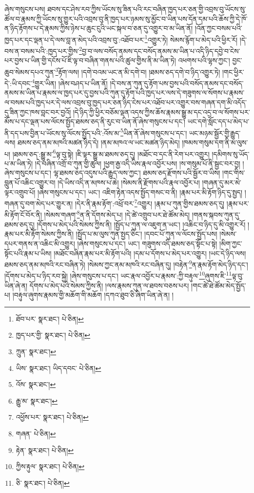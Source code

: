 ཞེས་གསུངས་པས། ཐབས་དང་ཤེས་རབ་ཀྱིས་ཡོངས་སུ་ཟིན་པའི་རང་བཞིན་ཁྱད་པར་ཅན་གྱི་འབྲས་བུ་ཡོངས་སུ་ཚོལ་བ་རྣམས་ཀྱི་ཡོངས་སུ་གྱུར་པའི་འབྲས་བུ་ནི་ཁྱད་པར་ཉམས་སུ་མྱོང་བ་ཡིན་པས་དོན་དམ་པའི་ཆོས་ཀྱི་དེ་ཁོ་ན་ཉིད་རྟོགས་པ་དེ་རྣམས་ཀྱིས་ཉེས་པ་ཆུང་ངུའི་ཡང་སྐལ་བ་ཅན་དུ་འགྱུར་བ་མ་ཡིན་ནོ། །འོན་ཀྱང་བསམ་པའི་ཁྱད་པར་དང་ལྡན་པ་དེ་ལས་བླ་ན་མེད་པའི་འབྲས་བུ་:འཐོབ་པར་\footnote{ཐོབ་པར་  སྣར་ཐང་།  པེ་ཅིན། }འགྱུར་ཏེ། སེམས་རྙོག་པ་མེད་པའི་ཕྱིར་རོ། །དེ་བས་ན་བསམ་པའི་:ཁྱད་པར་གྱིས་\footnote{ཁྱད་པར་གྱི་  སྣར་ཐང་།  པེ་ཅིན། }བྱ་བ་ལས་བསོད་ནམས་དང་བསོད་ནམས་མ་ཡིན་པ་འདི་ཉིད་དབྱེ་བ་ངེས་པར་བྱས་པ་ཡིན་གྱི་དངོས་པོ་ཇི་ལྟ་བ་བཞིན་གནས་པའི་ཚུལ་གྱིས་ནི་མ་ཡིན་ཏེ། འཕགས་པའི་ལྷས་ཀྱང་། བྱང་ཆུབ་སེམས་དཔའ་ཀུན་\footnote{ཀྲུན་  སྣར་ཐང་། }རྟོག་ལས། །དགེ་བའམ་ཡང་ན་མི་དགེ་བ། །ཐམས་ཅད་དགེ་བ་ཉིད་འགྱུར་ཏེ། །གང་ཕྱིར་དེ་:ཡི་དབང་\footnote{ཡིས་  སྣར་ཐང་། ཡིད་དབང་  པེ་ཅིན། }གྱུར་ཡིན། །ཞེས་བཤད་པ་ཡིན་ནོ། །དེ་བས་ན་ཀུན་དུ་རྟོག་པས་བྱས་པའི་བསོད་ནམས་དང་བསོད་ནམས་མ་ཡིན་པ་རྣམས་ལ་ཁྱད་པར་དུ་བྱས་པའི་ཀུན་དུ་རྟོག་པའི་ཁྱད་པར་ལས་དེ་གཟུགས་ལ་སོགས་པ་རྣམས་ལ་བསམ་པའི་ཁྱད་པར་དེ་ལས་འབྲས་བུ་ཁྱད་པར་ཅན་ཉིད་ངེས་པར་འཐོབ་པར་འགྱུར་བས་གཞན་དག་མི་འདོད་དུ་ཟིན་ཀྱང་ཁས་བླང་བར་བྱའོ། །དེ་ཉིད་ཀྱི་ཕྱིར་བཅོམ་ལྡན་འདས་ཀྱིས་ཆོས་རྣམས་སྒྱུ་མ་དང་འདྲ་བ་ལ་སོགས་པར་མོས་པ་དང་ལྡན་པས་ལོངས་སྤྱོད་ཐམས་ཅད་ནི་རུང་བ་ཡིན་ནོ་ཞེས་གསུངས་པ་དང་། ཡང་དགེ་སློང་དད་པ་མེད་པ་ནི་དད་པས་བྱིན་པ་ཡོངས་སུ་ལོངས་སྤྱོད་པའི་:འོས་མ་\footnote{འོས་  སྣར་ཐང་། }ཡིན་ནོ་ཞེས་གསུངས་པ་དང་། ཡང་མཉམ་སྦྱོར་གྱི་རྒྱུད་ལས། ཐམས་ཅད་ནམ་མཁའི་མཚན་ཉིད་དེ། །ནམ་མཁའ་ལ་ཡང་མཚན་ཉིད་མེད། །ཁམས་གསུམ་དག་ནི་མ་ལུས་པ། །ཐམས་ཅད་:སྒྱུ་མ་\footnote{རྒྱུ་མ་  སྣར་ཐང་། }ལྟ་བུ་སྟེ། །ཇི་ལྟར་སྒྱུ་མ་ཐམས་ཅད་དུ། །མཐོང་བ་དང་ནི་རེག་པར་འགྱུར། །དམིགས་སུ་ཡོད་པ་མ་ཡིན་ཏེ། །དེ་བཞིན་འགྲོ་བ་ཀུན་གྱི་ཚུལ། །ཕྱག་རྒྱ་འདི་ཡིས་རྣལ་འབྱོར་པས། །ས་གསུམ་པོ་ནི་སྦྱང་བར་བྱ། །ཞེས་གསུངས་པ་དང་། ལྷ་ཐམས་ཅད་འདུས་པའི་རྒྱུད་ལས་ཀྱང་། ཐམས་ཅད་རྫོགས་པའི་སྦྱོར་བ་ཡིས། །གང་གིས་བླུན་པོ་འཆིང་འགྱུར་བ། །དེ་ཡིས་འདི་ན་མཁས་པ་ཆེ། །སེམས་ནི་རྫོགས་པའི་རྣལ་འབྱོར་པ། །གཞན་དུ་མར་མེ་ལྟར་འགྲུབ་པོ། །ཞེས་གསུངས་པ་དང་། ཡང་། འཇིག་རྟེན་འདས་སྤྱོད་གསང་བ་ནི། །རྣམ་པར་མི་རྟོག་ཉིད་དུ་སྤྱད། །གཞན་དུ་བག་མེད་པར་གྱུར་ན། །དེར་ནི་རྣམ་རྟོག་:འཕྲོ་བར་\footnote{འཕྱོས་པར་  སྣར་ཐང་།  པེ་ཅིན། }འགྱུར། །རྣམ་པ་ཀུན་གྱིས་ཐམས་ཅད་དུ། །རྣམ་པར་མི་རྟོག་ངོ་བོར་ནི། །སེམས་གཞག་\footnote{གཞན་  པེ་ཅིན། }ན་ནི་དོགས་མེད་པ། །དེ་ཚེ་འགྲུབ་པར་ཐེ་ཚོམ་མེད། །གནས་སྐབས་ཀུན་དུ་ཐམས་ཅད་དུ། །དོགས་པ་མེད་པའི་སེམས་ཀྱིས་ནི། །སྤྱོད་པ་ཀུན་ལ་འཇུག་ན་ཡང་། །འཆིང་བ་ཉིད་དུ་མི་འགྱུར་རོ། །རྣམ་པར་མི་རྟོག་སེམས་ཀྱིས་ནི། །སྤྱོད་པ་མ་ལུས་ཀུན་སྤྱད་ཅིང་། །དབང་པོ་ཀུན་ལ་ལོངས་སྤྱོད་པས། །སེམས་དཔར་གནས་ན་འཆིང་མི་འགྱུར། །ཞེས་གསུངས་པ་དང་། ཡང་། གཟུགས་འདི་ཐམས་ཅད་སྟོང་པ་སྟེ། །མིག་ཀྱང་སྟོང་པའི་རྣམ་པ་ཡིས། །མཐོང་བཞིན་རྣམ་པར་མི་རྟོག་པའི། །དམ་པ་དོགས་པ་མེད་པར་འགྱུར། །ཡང་དེ་ཉིད་ལས། ཐམས་ཅད་ནམ་མཁའི་རང་བཞིན་ཏེ། །སེམས་ཀྱང་ནམ་མཁའི་རང་བཞིན་དུ། །བརྟེན་\footnote{རྟེན་  སྣར་ཐང་།  པེ་ཅིན། }ན་རྣམ་རྟོག་མེད་ཉིད་དང་། །དོགས་པ་མེད་པ་ཉིད་རབ་སྐྱེ། །ཞེས་གསུངས་པ་དང་། ཡང་རྣལ་འབྱོར་པ་རྣམས་:ཀྱི་བརྟུལ་\footnote{ཀྱིས་རྟུལ་  སྣར་ཐང་།  པེ་ཅིན། }ཞུགས་ཇི་\footnote{ཅི་  སྣར་ཐང་།  པེ་ཅིན། }ལྟ་བུ་ཡིན་ཞེ་ན། དོགས་པ་མེད་པའི་སེམས་ཀྱིས་ནི། །ལས་རྣམས་ཀུན་ལ་ཐབས་བཅས་པར། །གང་ཚེ་ཐེ་ཚོམ་མེད་སྤྱོད་པ། །བརྟུལ་ཞུགས་རྣམས་གྱི་མཆོག་གི་མཆོག །དཀའ་ཐུབ་ཅི་ཞིག་ཡིན་ཞེ་ན། །
